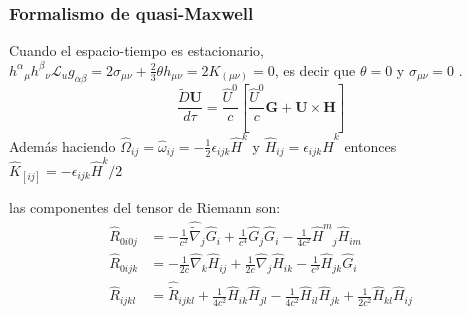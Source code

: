\documentclass[aspectratio=169,10pt,usenames,dvipsnames,spanish]{beamer}
\newcommand{\ve}[1]{\mathbf{#1}}    %
\begin{document}
\begin{frame}
\frametitle{Formalismo de quasi-Maxwell}
Cuando el espacio-tiempo es estacionario, $h^{\alpha}{}_{\mu}h^{\beta}{}_{\nu}\mathscr{L}_u g_{\alpha\beta}=2\sigma_{\mu\nu}+\frac{2}{3}\theta h_{\mu\nu}=2K_{(\mu\nu)}=0$, es decir que $\theta=0$ y $\sigma_{\mu\nu}=0$ \parencite{MunizOliva2002,Natario2007}.
\begin{equation}\label{FLorentz_inerciales_Quasi}
	\frac{\tilde{D} \ve{U}}{d\tau}=\frac{\hat{U}^0}{c}\left[\frac{\hat{U}^0}{c} \ve{G}+\ve{U} \times \ve{H}\right]
\end{equation}
Además haciendo $\hat{\Omega}_{ij}=\hat{\omega}_{ij}=-\frac{1}{2}\epsilon_{ijk}\hat{H}^k$ y $\hat{H}_{ij}=\epsilon_{ijk}\hat{H}^k$ entonces $\hat{K}_{[ij]}=-\epsilon_{ijk}\hat{H}^k/2$

 las componentes del tensor de Riemann son:
\begin{align}
	\label{Ecuacion:R0i0j estacionario} \hat{R}_{0i0j}&=-\frac{1}{c^2}\hat{\tilde{\nabla}}_j\hat{G}_i+\frac{1}{c^4}\hat{G}_j\hat{G}_i-\frac{1}{4c^2}\hat{H}^{m}{}_{j}\hat{H}_{im}\\
	\label{Ecuacion:R0ijk estacionario} \hat{R}_{0ijk}&=-\frac{1}{2c}\hat{\nabla}_k\hat{H}_{ij}+\frac{1}{2c}\hat{\nabla}_j\hat{H}_{ik}-\frac{1}{c^3}\hat{H}_{jk}\hat{G}_i\\
	\label{Ecuacion:Rijkl estacionario} \hat{R}_{ijkl}&=\hat{\tilde{R}}_{ijkl}+\frac{1}{4c^2}\hat{H}_{ik}\hat{H}_{jl}-\frac{1}{4c^2}\hat{H}_{il}\hat{H}_{jk}+\frac{1}{2c^2}\hat{H}_{kl}\hat{H}_{ij}
\end{align}
\end{frame}


\end{document}
